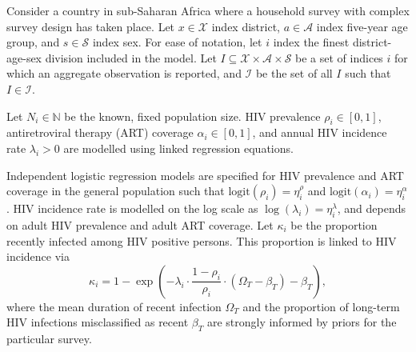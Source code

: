 \documentclass[a4paper, nobind]{templates/ociamthesis}
\begin{document}
Consider a country in sub-Saharan Africa where a household survey with complex survey design has taken place.
Let \(x \in \mathcal{X}\) index district, \(a \in \mathcal{A}\) index five-year age group, and \(s \in \mathcal{S}\) index sex.
For ease of notation, let \(i\) index the finest district-age-sex division included in the model.
Let \(I \subseteq \mathcal{X} \times \mathcal{A} \times \mathcal{S}\) be a set of indices \(i\) for which an aggregate observation is reported, and \(\mathcal{I}\) be the set of all \(I\) such that \(I \in \mathcal{I}\).

Let \(N_i \in \mathbb{N}\) be the known, fixed population size.
HIV prevalence \(\rho_i \in [0, 1]\), antiretroviral therapy (ART) coverage \(\alpha_i \in [0, 1]\), and annual HIV incidence rate \(\lambda_i > 0\) are modelled using linked regression equations.

Independent logistic regression models are specified for HIV prevalence and ART coverage in the general population such that \(\text{logit}(\rho_i) = \eta^\rho_i\) and \(\text{logit}(\alpha_i) = \eta^\alpha_i\).
HIV incidence rate is modelled on the log scale as \(\log(\lambda_i) = \eta^\lambda_i\), and depends on adult HIV prevalence and adult ART coverage.
Let \(\kappa_i\) be the proportion recently infected among HIV positive persons.
This proportion is linked to HIV incidence via
\begin{equation}
\kappa_i = 1- \exp \left( - \lambda_i \cdot \frac{1 - \rho_i}{\rho_i} \cdot (\Omega_T - \beta_T) - \beta_T \right), \label{eq:kappa}
\end{equation}
where the mean duration of recent infection \(\Omega_T\) and the proportion of long-term HIV infections misclassified as recent \(\beta_T\) are strongly informed by priors for the particular survey.
\end{document}
